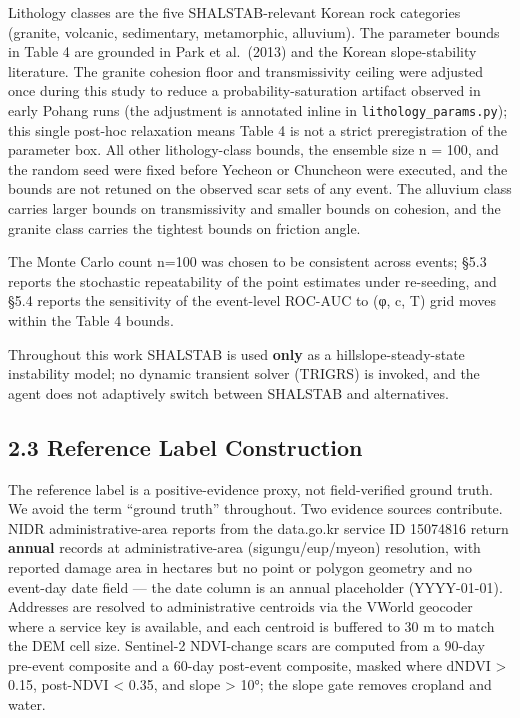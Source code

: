 \documentclass[11pt,a4paper]{article}
\begin{document}
Lithology classes are the five SHALSTAB-relevant Korean rock categories (granite, volcanic, sedimentary, metamorphic, alluvium). The parameter bounds in Table 4 are grounded in Park et al.~(2013) and the Korean slope-stability literature. The granite cohesion floor and transmissivity ceiling were adjusted once during this study to reduce a probability-saturation artifact observed in early Pohang runs (the adjustment is annotated inline in \texttt{lithology\_params.py}); this single post-hoc relaxation means Table 4 is not a strict preregistration of the parameter box. All other lithology-class bounds, the ensemble size n = 100, and the random seed were fixed before Yecheon or Chuncheon were executed, and the bounds are not retuned on the observed scar sets of any event. The alluvium class carries larger bounds on transmissivity and smaller bounds on cohesion, and the granite class carries the tightest bounds on friction angle.

The Monte Carlo count n=100 was chosen to be consistent across events; §5.3 reports the stochastic repeatability of the point estimates under re-seeding, and §5.4 reports the sensitivity of the event-level ROC-AUC to (φ, c, T) grid moves within the Table 4 bounds.

Throughout this work SHALSTAB is used \textbf{only} as a hillslope-steady-state instability model; no dynamic transient solver (TRIGRS) is invoked, and the agent does not adaptively switch between SHALSTAB and alternatives.

\subsection{2.3 Reference Label Construction}\label{reference-label-construction}

The reference label is a positive-evidence proxy, not field-verified ground truth. We avoid the term ``ground truth'' throughout. Two evidence sources contribute. NIDR administrative-area reports from the data.go.kr service ID 15074816 return \textbf{annual} records at administrative-area (sigungu/eup/myeon) resolution, with reported damage area in hectares but no point or polygon geometry and no event-day date field --- the date column is an annual placeholder (YYYY-01-01). Addresses are resolved to administrative centroids via the VWorld geocoder where a service key is available, and each centroid is buffered to 30 m to match the DEM cell size. Sentinel-2 NDVI-change scars are computed from a 90-day pre-event composite and a 60-day post-event composite, masked where dNDVI \textgreater{} 0.15, post-NDVI \textless{} 0.35, and slope \textgreater{} 10°; the slope gate removes cropland and water.
\end{document}
